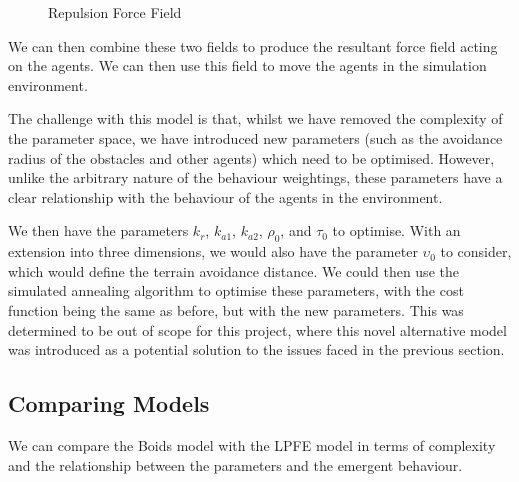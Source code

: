 \documentclass[12pt]{article}
\begin{document}
\begin{figure}[ht]
    \centering
{}
    \caption{Repulsion Force Field}
    \label{fig:force-field-rep}
\end{figure}

We can then combine these two fields to produce the resultant force field acting on the agents. We can then use this field to move the agents in the simulation environment.

The challenge with this model is that, whilst we have removed the complexity of the parameter space, we have introduced new parameters (such as the avoidance radius of the obstacles and other agents) which need to be optimised. However, unlike the arbitrary nature of the behaviour weightings, these parameters have a clear relationship with the behaviour of the agents in the environment. 

We then have the parameters $k_r$, $k_{a1}$, $k_{a2}$, $\rho_0$, and $\tau_0$ to optimise. With an extension into three dimensions, we would also have the parameter $\upsilon_0$ to consider, which would define the terrain avoidance distance. We could then use the simulated annealing algorithm to optimise these parameters, with the cost function being the same as before, but with the new parameters. This was determined to be out of scope for this project, where this novel alternative model was introduced as a potential solution to the issues faced in the previous section. 

\subsection{Comparing Models}
We can compare the Boids model with the LPFE model in terms of complexity and the relationship between the parameters and the emergent behaviour.
\end{document}
